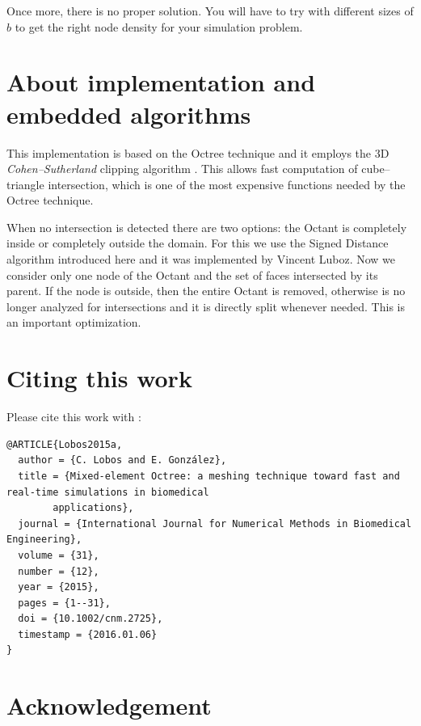 \documentclass[10pt]{article}
\begin{document}
Once more, there is no proper solution. You will have to try with different sizes of $b$ to get the right node density for your simulation problem.


\section{About implementation and embedded algorithms}
\label{algos}

This implementation is based on the Octree technique and it employs the 3D \textit{Cohen--Sutherland} clipping algorithm \cite[p. 113]{Foley1996}. This allows fast computation of cube--triangle intersection, which is one of the most expensive functions needed by the Octree technique.

When no intersection is detected there are two options: the Octant is completely inside or completely outside the domain. For this we use the Signed Distance algorithm introduced here \cite{Baerentzen2005} and it was implemented by Vincent Luboz. Now we consider only one node of the Octant and the set of faces intersected by its parent. If the node is outside, then the entire Octant is removed, otherwise is no longer analyzed for intersections and it is directly split whenever needed. This is an important optimization.


\section{Citing this work}
\label{citing}

Please cite this work with \cite{Lobos2015a}:

{\footnotesize
\begin{verbatim}
@ARTICLE{Lobos2015a,
  author = {C. Lobos and E. González},
  title = {Mixed-element Octree: a meshing technique toward fast and real-time simulations in biomedical 
  		applications},
  journal = {International Journal for Numerical Methods in Biomedical Engineering},
  volume = {31},
  number = {12},
  year = {2015},
  pages = {1--31},
  doi = {10.1002/cnm.2725},
  timestamp = {2016.01.06}
}
\end{verbatim}
}
    
\section*{Acknowledgement}
\end{document}
